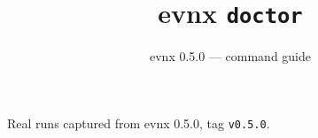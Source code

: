 \documentclass[aspectratio=169,10pt]{beamer}
\title{evnx \texttt{doctor}}
\subtitle{evnx 0.5.0 — command guide}
\date{}
\begin{document}
\begin{frame}[plain]\titlepage
  \begin{center}\footnotesize
  \textcolor{evnxMuted}{Real runs captured from evnx 0.5.0, tag \texttt{v0.5.0}.}
  \end{center}
\end{frame}

\end{document}
